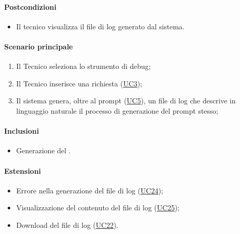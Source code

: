 \paragraph*{Postcondizioni}
\begin{itemize}
  \item Il tecnico visualizza il file di log generato dal sistema.
\end{itemize}

\paragraph*{Scenario principale}
\begin{enumerate}
  \item Il Tecnico seleziona lo strumento di debug;
  \item Il Tecnico inserisce una richiesta (\hyperref[UC3]{UC3});
  \item Il sistema genera, oltre al prompt (\hyperref[UC5]{UC5}), un file di log che descrive in linguaggio naturale il processo di generazione del prompt stesso; 
\end{enumerate}

\paragraph*{Inclusioni}
\begin{itemize}
  \item Generazione del .
\end{itemize}

\paragraph*{Estensioni}
\begin{itemize}
  \item Errore nella generazione del file di log (\hyperref[UC24]{UC24});
  \item Visualizzazione del contenuto del file di log (\hyperref[UC25]{UC25});
  \item Download del file di log (\hyperref[UC22]{UC22}).
\end{itemize}